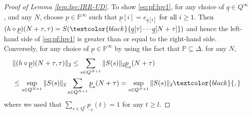 \documentclass[journal,twoside,web]{ieeecolor}
\begin{document}
\begin{proof}[Proof of Lemma \ref{lem:lpv:IRR-UD}]
        To show \eqref{eq:pf:lpv1}, for any choice of $\underline{q} \in Q^{\infty}$, and any $N$, choose $\underline{p} \in \mathbb{P}^{\infty}$ such that $\underline{p}[i]=e_{\underline{q}[i]}$ \textcolor{black}{for all $i \ge 1$}. Then 
        $(h \diamond \underline{p})(N+\tau,\tau)=S(\textcolor{black}{\underline{q}[\tau] \cdots \underline{q}[N+\tau]})$
        and hence the left-hand side of \eqref{eq:pf:lpv1} is greater than or equal to the right-hand side.
        Conversely, for any choice of $\underline{p} \in \mathbb{P}^{\infty}$
	  by using the fact that $\mathbb{P} \subseteq \Delta$\textcolor{red}{,}  for any $N$, %
        \[ 
          \begin{split}
             & \|(h \diamond \underline{p})(N+\tau,\tau)\|_2  \le \sum_{s \in Q^{N+1}} \|S(s)\|_2 \underline{p}_s(N+\tau) \\
            & \le \sup_{s \in Q^{N+1}} \|S(s)\|_2 \sum_{s \in Q^{N+1}} \underline{p}_s(N+\tau) =
            \sup_{s \in Q^{N+1}} \|S(s)\|_2 \textcolor{black}{,}
          \end{split}
        \]
        where we used that  $\sum_{s \in Q^l} \underline{p}_s(t) = 1$ for any $t \ge l$.

\end{proof}
\end{document}
